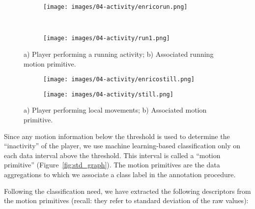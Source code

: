 \begin{figure}[H]
    \centering
    \begin{subfigure}[b]{0.3\textwidth}
     	\centering
        \texttt{[image: images/04-activity/enricorun.png]}
        \caption{}
	\end{subfigure}
	~
    \begin{subfigure}[b]{0.3\textwidth}
     	\centering
        \texttt{[image: images/04-activity/run1.png]}
        \caption{}
	\end{subfigure}
	\caption{a) Player performing a running activity;  b) Associated running motion primitive.}\label{fig:running}
\end{figure}

\begin{figure}[H]
  \centering
  \begin{subfigure}[b]{0.3\textwidth}
  	 \centering
      \texttt{[image: images/04-activity/enricostill.png]}
      \caption{}
  \end{subfigure}
  \begin{subfigure}[b]{0.3\textwidth}
  	 \centering
      \texttt{[image: images/04-activity/still.png]}
      \caption{}
  \end{subfigure}
  \caption{a) Player performing local movements; b) Associated motion primitive.}    
  \label{fig:localmov}
\end{figure}
    
Since any motion information below the threshold is used to determine the ``inactivity'' of the player, we use machine learning-based classification only on each data interval above the threshold. This interval is called a ``motion primitive'' (Figure~\ref{fig:std_graph}). The motion primitives are the data aggregations to which we associate a class label in the annotation procedure. 

Following the classification need, we have extracted the following descriptors from the motion primitives (recall: they refer to standard deviation of the raw values): 

